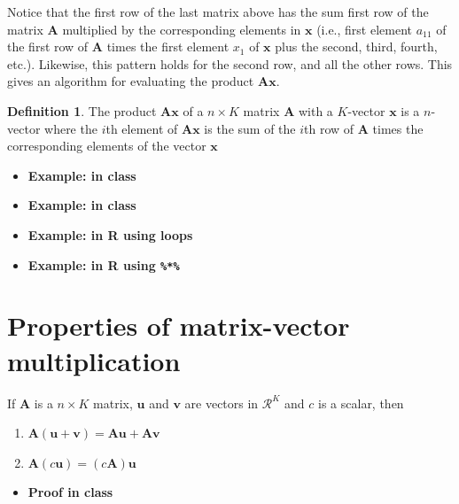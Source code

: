 \documentclass[
]{book}
\providecommand{\tightlist}{%
  \setlength{\itemsep}{0pt}\setlength{\parskip}{0pt}}
\theoremstyle{definition}
\newtheorem{definition}{Definition}[chapter]
\theoremstyle{definition}
\theoremstyle{definition}
\theoremstyle{remark}
\begin{document}
Notice that the first row of the last matrix above has the sum first row of the matrix \(\mathbf{A}\) multiplied by the corresponding elements in \(\mathbf{x}\) (i.e., first element \(a_{11}\) of the first row of \(\mathbf{A}\) times the first element \(x_1\) of \(\mathbf{x}\) plus the second, third, fourth, etc.). Likewise, this pattern holds for the second row, and all the other rows. This gives an algorithm for evaluating the product \(\mathbf{A} \mathbf{x}\).

\begin{definition}
\protect\hypertarget{def:unnamed-chunk-95}{}{\label{def:unnamed-chunk-95} }The product \(\mathbf{A}\mathbf{x}\) of a \(n \times K\) matrix \(\mathbf{A}\) with a \(K\)-vector \(\mathbf{x}\) is a \(n\)-vector where the \(i\)th element of \(\mathbf{A}\mathbf{x}\) is the sum of the \(i\)th row of \(\mathbf{A}\) times the corresponding elements of the vector \(\mathbf{x}\)
\end{definition}

\begin{itemize}
\item
  \textbf{Example: in class}
\item
  \textbf{Example: in class}
\item
  \textbf{Example: in R using loops}
\item
  \textbf{Example: in R using \texttt{\%*\%}}
\end{itemize}

\hypertarget{properties-of-matrix-vector-multiplication}{%
\section{Properties of matrix-vector multiplication}\label{properties-of-matrix-vector-multiplication}}

If \(\mathbf{A}\) is a \(n \times K\) matrix, \(\mathbf{u}\) and \(\mathbf{v}\) are vectors in \(\mathcal{R}^K\) and \(c\) is a scalar, then

\begin{enumerate}
\def\labelenumi{\alph{enumi})}
\tightlist
\item
  \(\mathbf{A} (\mathbf{u} + \mathbf{v}) = \mathbf{A} \mathbf{u} + \mathbf{A} \mathbf{v}\)
\item
  \(\mathbf{A} (c \mathbf{u}) = (c \mathbf{A}) \mathbf{u}\)
\end{enumerate}

\begin{itemize}
\tightlist
\item
  \textbf{Proof in class}
\end{itemize}
\end{document}

